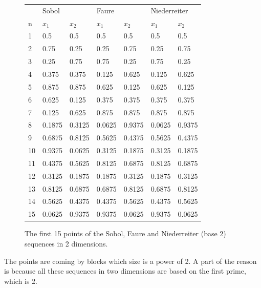 \begin{figure}[htbp]
\begin{center}
\begin{tabular}{l|ll|ll|ll}
       & \multicolumn{2}{l}{Sobol}  & \multicolumn{2}{|l}{Faure} & \multicolumn{2}{|l}{Niederreiter} \\      
    n  & $x_1$  & $x_2$  & $x_1$  & $x_2$  & $x_1$        & $x_2$     \\
	   \hline
    1 & 0.5    & 0.5    & 0.5    & 0.5    & 0.5          & 0.5    \\
    2 & 0.75   & 0.25   & 0.25   & 0.75   & 0.25         & 0.75   \\
    3 & 0.25   & 0.75   & 0.75   & 0.25   & 0.75         & 0.25   \\
    4 & 0.375  & 0.375  & 0.125  & 0.625  & 0.125        & 0.625  \\
    5 & 0.875  & 0.875  & 0.625  & 0.125  & 0.625        & 0.125  \\
    6 & 0.625  & 0.125  & 0.375  & 0.375  & 0.375        & 0.375  \\
    7 & 0.125  & 0.625  & 0.875  & 0.875  & 0.875        & 0.875  \\
    8 & 0.1875 & 0.3125 & 0.0625 & 0.9375 & 0.0625       & 0.9375 \\
    9 & 0.6875 & 0.8125 & 0.5625 & 0.4375 & 0.5625       & 0.4375 \\
    10& 0.9375 & 0.0625 & 0.3125 & 0.1875 & 0.3125       & 0.1875 \\
    11& 0.4375 & 0.5625 & 0.8125 & 0.6875 & 0.8125       & 0.6875 \\
    12& 0.3125 & 0.1875 & 0.1875 & 0.3125 & 0.1875       & 0.3125 \\
    13& 0.8125 & 0.6875 & 0.6875 & 0.8125 & 0.6875       & 0.8125 \\
    14& 0.5625 & 0.4375 & 0.4375 & 0.5625 & 0.4375       & 0.5625 \\
    15& 0.0625 & 0.9375 & 0.9375 & 0.0625 & 0.9375       & 0.0625 \\
\end{tabular}
\end{center}
\caption{The first 15 points of the Sobol, Faure and Niederreiter (base 2) sequences in 2 dimensions.}
\label{fig-sobfaunied-n15-s2}
\end{figure}
	
The points are coming by blocks which size is a power of 2. 
A part of the reason is because all these sequences 
in two dimensions are based on the first prime, which is 2.

